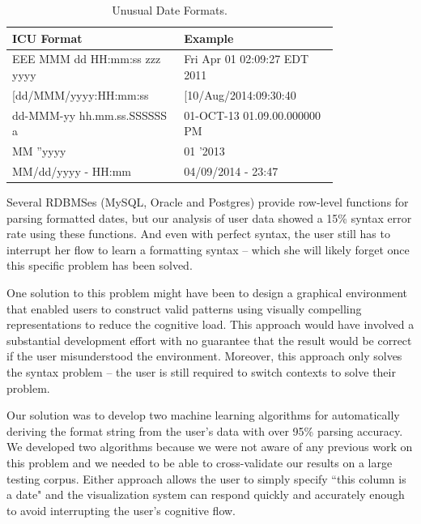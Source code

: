 \begin{table}[ht]
\centering
\bgroup
\def\arraystretch{1.5}
\begin{tabular}{|p{0.4\linewidth}| p{0.4\linewidth}|}
\hline
\centering
\textbf{ICU Format} & \textbf{Example}\\ \hline
\scriptsize{EEE MMM dd HH:mm:ss zzz yyyy} & \scriptsize{Fri Apr 01 02:09:27 EDT 2011}\\ \hline
\scriptsize{[dd/MMM/yyyy:HH:mm:ss} & \scriptsize{[10/Aug/2014:09:30:40}\\ \hline
\scriptsize{dd-MMM-yy hh.mm.ss.SSSSSS a} & \scriptsize{01-OCT-13 01.09.00.000000 PM}\\ \hline
\scriptsize{MM ''yyyy} & \scriptsize{01 '2013}\\ \hline
\scriptsize{MM/dd/yyyy - HH:mm} & \scriptsize{04/09/2014 - 23:47}\\ \hline
\end{tabular}
\egroup
\label{tab:dateformats}
\caption{Unusual Date Formats.}
\end{table}

Several RDBMSes (\eg MySQL, Oracle and Postgres) provide row-level functions for parsing formatted dates, but our analysis of user data showed a 15\% syntax error rate using these functions. And even with perfect syntax, the user still has to interrupt her flow to learn a formatting syntax -- which she will likely forget once this specific problem has been solved.

One solution to this problem might have been to design a graphical environment that enabled users to construct valid patterns using visually compelling representations to reduce the cognitive load. This approach would have involved a substantial development effort with no guarantee that the result would be correct if the user misunderstood the environment. Moreover, this approach only solves the syntax problem -- the user is still required to switch contexts to solve their problem.

Our solution was to develop two machine learning algorithms for automatically deriving the format string from the user's data with over 95\% parsing accuracy. We developed two algorithms because we were not aware of any previous work on this problem and we needed to be able to cross-validate our results on a large testing corpus. Either approach allows the user to simply specify ``this column is a date" and the visualization system can respond quickly and accurately enough to avoid interrupting the user's cognitive flow.

